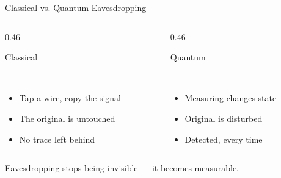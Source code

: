 \documentclass[aspectratio=169]{beamer}
\begin{document}
\begin{frame}{Classical vs. Quantum Eavesdropping}
\begin{center}
\begin{columns}[T]
\begin{column}{0.46\textwidth}
\colorbox{purplebox}{\parbox{\linewidth}{\centering\color{white}\Large\vspace{4pt}Classical\vspace{4pt}}}\\[-0.4pt]
\colorbox{lavbg}{\parbox{\linewidth}{\vspace{5pt}
\begin{minipage}[t][1.75cm][t]{\linewidth}
\begin{itemize}
  \item Tap a wire, copy the signal
  \item The original is untouched
  \item No trace left behind
\end{itemize}
\end{minipage}
\vspace{2pt}}}
\end{column}
\begin{column}{0.46\textwidth}
\colorbox{purplebox}{\parbox{\linewidth}{\centering\color{white}\Large\vspace{4pt}Quantum\vspace{4pt}}}\\[-0.4pt]
\colorbox{lavbg}{\parbox{\linewidth}{\vspace{5pt}
\begin{itemize}
  \item Measuring changes state
  \item Original is disturbed
  \item Detected, every time
\end{itemize}
\vspace{2pt}}}
\end{column}
\end{columns}
\end{center}
\vspace{0.5cm}
\begin{center}
Eavesdropping stops being invisible --- it becomes measurable.
\end{center}
\end{frame}
\end{document}
